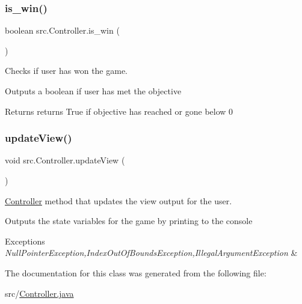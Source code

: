 \subsubsection{\texorpdfstring{is\+\_\+win()}{is\_win()}}
{\footnotesize\ttfamily boolean src.\+Controller.\+is\+\_\+win (\begin{DoxyParamCaption}{ }\end{DoxyParamCaption})}



Checks if user has won the game. 

Outputs a boolean if user has met the objective \begin{DoxyReturn}{Returns}
returns True if objective has reached or gone below 0 
\end{DoxyReturn}
\mbox{\label{classsrc_1_1Controller_abb1eafa89e545370a7ad98e293731d04}} 
\subsubsection{\texorpdfstring{update\+View()}{updateView()}}
{\footnotesize\ttfamily void src.\+Controller.\+update\+View (\begin{DoxyParamCaption}{ }\end{DoxyParamCaption})}



\hyperlink{classsrc_1_1Controller}{Controller} method that updates the view output for the user. 

Outputs the state variables for the game by printing to the console 
\begin{DoxyExceptions}{Exceptions}
{\em Null\+Pointer\+Exception,Index\+Out\+Of\+Bounds\+Exception,Illegal\+Argument\+Exception} & \\
\hline
\end{DoxyExceptions}


The documentation for this class was generated from the following file\+:\begin{DoxyCompactItemize}
\item 
src/\hyperlink{Controller_8java}{Controller.\+java}\end{DoxyCompactItemize}
